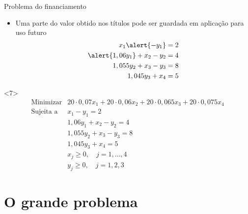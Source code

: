 \documentclass[10pt]{beamer}
\begin{document}
\begin{frame}{Problema do financiamento}
\begin{itemize}
  \item<only@6> Uma parte do valor obtido nos títulos pode ser
    guardada em aplicação para uso futuro
    \[
      \begin{aligned}
        x_1 \alert{- y_1} & = 2 \\
        \alert{1,06 y_1} + x_2 - y_2 & = 4 \\
        1,055 y_2 + x_3 - y_3 & = 8 \\
        1,045 y_3 + x_4 & = 5
      \end{aligned}
    \]
  \end{itemize}

  \begin{onlyenv}<7>
    \[
      \begin{array}{ll}
        \mbox{Minimizar} & 20 \cdot 0,07 x_1 + 20 \cdot 0,06 x_2 + 20 \cdot 0,065 x_3 + 20\cdot 0,075 x_4 \\
        \mbox{Sujeita a} &         x_1 - y_1 = 2 \\
                         & 1,06 y_1 + x_2 - y_2  = 4 \\
                         & 1,055 y_2 + x_3 - y_3  = 8 \\
                         & 1,045 y_3 + x_4 = 5 \\
                         & x_j \ge 0,\quad j = 1, \dots, 4 \\
                         & y_j \ge 0,\quad j = 1, 2, 3
      \end{array}
    \]
  \end{onlyenv}
  
\end{frame}

\section{O grande problema}
\end{document}
